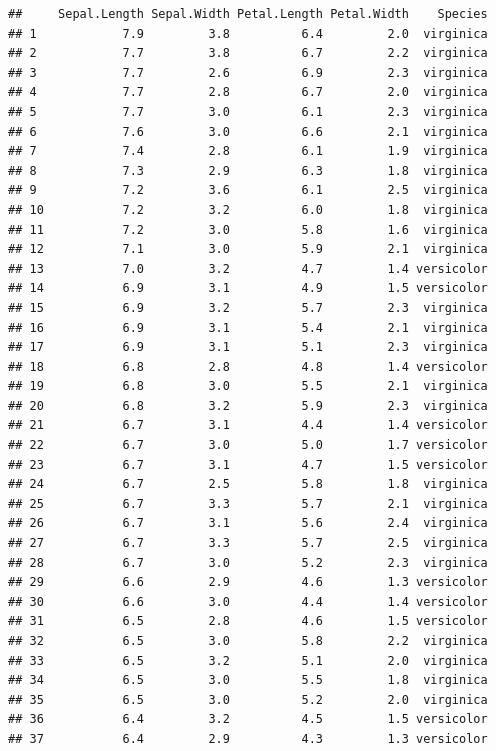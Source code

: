 \documentclass[
]{article}
\begin{document}
\begin{verbatim}
##     Sepal.Length Sepal.Width Petal.Length Petal.Width    Species
## 1            7.9         3.8          6.4         2.0  virginica
## 2            7.7         3.8          6.7         2.2  virginica
## 3            7.7         2.6          6.9         2.3  virginica
## 4            7.7         2.8          6.7         2.0  virginica
## 5            7.7         3.0          6.1         2.3  virginica
## 6            7.6         3.0          6.6         2.1  virginica
## 7            7.4         2.8          6.1         1.9  virginica
## 8            7.3         2.9          6.3         1.8  virginica
## 9            7.2         3.6          6.1         2.5  virginica
## 10           7.2         3.2          6.0         1.8  virginica
## 11           7.2         3.0          5.8         1.6  virginica
## 12           7.1         3.0          5.9         2.1  virginica
## 13           7.0         3.2          4.7         1.4 versicolor
## 14           6.9         3.1          4.9         1.5 versicolor
## 15           6.9         3.2          5.7         2.3  virginica
## 16           6.9         3.1          5.4         2.1  virginica
## 17           6.9         3.1          5.1         2.3  virginica
## 18           6.8         2.8          4.8         1.4 versicolor
## 19           6.8         3.0          5.5         2.1  virginica
## 20           6.8         3.2          5.9         2.3  virginica
## 21           6.7         3.1          4.4         1.4 versicolor
## 22           6.7         3.0          5.0         1.7 versicolor
## 23           6.7         3.1          4.7         1.5 versicolor
## 24           6.7         2.5          5.8         1.8  virginica
## 25           6.7         3.3          5.7         2.1  virginica
## 26           6.7         3.1          5.6         2.4  virginica
## 27           6.7         3.3          5.7         2.5  virginica
## 28           6.7         3.0          5.2         2.3  virginica
## 29           6.6         2.9          4.6         1.3 versicolor
## 30           6.6         3.0          4.4         1.4 versicolor
## 31           6.5         2.8          4.6         1.5 versicolor
## 32           6.5         3.0          5.8         2.2  virginica
## 33           6.5         3.2          5.1         2.0  virginica
## 34           6.5         3.0          5.5         1.8  virginica
## 35           6.5         3.0          5.2         2.0  virginica
## 36           6.4         3.2          4.5         1.5 versicolor
## 37           6.4         2.9          4.3         1.3 versicolor

\end{verbatim}
\end{document}
